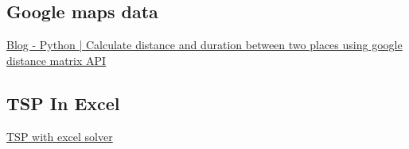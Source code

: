 \subsection{Google maps data}
\href{https://www.geeksforgeeks.org/python-calculate-distance-duration-two-places-using-google-distance-matrix-api/}{Blog - Python | Calculate distance and duration between two places using google distance matrix API}

\subsection{TSP In Excel}

\href{https://www.youtube.com/watch?v=UQYJvSjXE6I}{TSP with excel solver}

%

